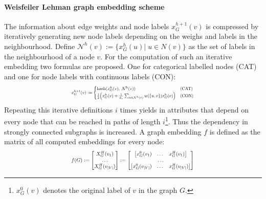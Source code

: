 \documentclass[twoside,twocolumn]{scrartcl}
\begin{document}
\paragraph{Weisfeiler Lehman graph embedding scheme} The information about edge weights and node labels $x^{h+1}_G(v)$ is compressed by iteratively generating new node labels depending on the weighs and labels in the neighbourhood. Define $\mathcal{N}^h(v):=\{x^{h}_G(u)|\; u\in N(v)\}$ as the set of labels in the neighbourhood of a node $v$. For the computation of such an iterative embedding two formulas are proposed. One for categorical labelled nodes (CAT) and one for node labels with continuous labels (CON):
\begin{equation*}
\resizebox{0.5\textwidth}{!}{$
	x^{h+1}_G(v) := \begin{cases}
	\text{hash}(x^{h}_G(v), \; \mathcal{N}^h(v)) & \text{(CAT)}\\ 
	\frac{1}{2}\Big(x^{h}_G(v) + \frac{1}{d_v} \sum_{u\in \mathcal{N}^h(v)}w(\{u,v\})x^{h}_G(v)\Big)  & \text{(CON)}\\ 
	\end{cases}	
$}
\end{equation*}
Repeating this iterative definitions $i$ times yields in attributes that depend on every node that can be reached in paths of length $i$\footnote{$x^{0}_G(v)$ denotes the original label of $v$ in the graph $G$.}. Thus the dependency in strongly connected subgraphs is increased. A graph embedding $f$ is defined as the matrix of all computed embeddings for every node:
\begin{equation*}
\resizebox{0.5\textwidth}{!}{$
	f(G) := \begin{bmatrix}
	X^H_G(v_1) \\ \dots \\ X^H_G(v_{|V|})
	\end{bmatrix} := \begin{bmatrix}
	\begin{bmatrix}
	x^{0}_G(v_1) & \dots & x^{H}_G(v_1)
	\end{bmatrix} \\ \dots \\ \begin{bmatrix}
	x^{0}_G(v_{|V|}) & \dots & x^{H}_G(v_{|V|})
	\end{bmatrix}
	\end{bmatrix}
	$}
\end{equation*}
\end{document}
